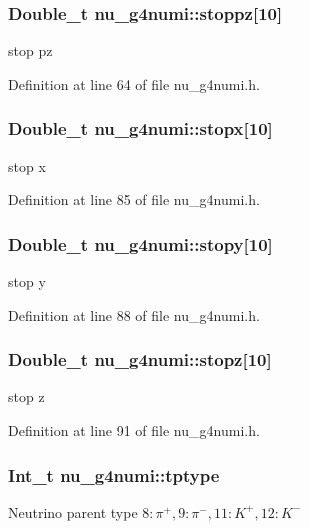 \hypertarget{classnu__g4numi_a64a1fb6d3798714d21c1135b76014d3a}{
\subsubsection[{stoppz}]{\setlength{\rightskip}{0pt plus 5cm}Double\-\_\-t nu\-\_\-g4numi\-::stoppz\mbox{[}10\mbox{]}}}\label{classnu__g4numi_a64a1fb6d3798714d21c1135b76014d3a}
stop pz 

Definition at line 64 of file nu\-\_\-g4numi.\-h.

\hypertarget{classnu__g4numi_a3a3be4d4530073e364c2681eedf1c549}{
\subsubsection[{stopx}]{\setlength{\rightskip}{0pt plus 5cm}Double\-\_\-t nu\-\_\-g4numi\-::stopx\mbox{[}10\mbox{]}}}\label{classnu__g4numi_a3a3be4d4530073e364c2681eedf1c549}
stop x 

Definition at line 85 of file nu\-\_\-g4numi.\-h.

\hypertarget{classnu__g4numi_a04c56aedc6b4d97052a8a827131bf5ba}{
\subsubsection[{stopy}]{\setlength{\rightskip}{0pt plus 5cm}Double\-\_\-t nu\-\_\-g4numi\-::stopy\mbox{[}10\mbox{]}}}\label{classnu__g4numi_a04c56aedc6b4d97052a8a827131bf5ba}
stop y 

Definition at line 88 of file nu\-\_\-g4numi.\-h.

\hypertarget{classnu__g4numi_ab4cc476c30fea6d69043531da7e6c969}{
\subsubsection[{stopz}]{\setlength{\rightskip}{0pt plus 5cm}Double\-\_\-t nu\-\_\-g4numi\-::stopz\mbox{[}10\mbox{]}}}\label{classnu__g4numi_ab4cc476c30fea6d69043531da7e6c969}
stop z 

Definition at line 91 of file nu\-\_\-g4numi.\-h.

\hypertarget{classnu__g4numi_a1047ac371479cee32c28f56adf885515}{
\subsubsection[{tptype}]{\setlength{\rightskip}{0pt plus 5cm}Int\-\_\-t nu\-\_\-g4numi\-::tptype}}\label{classnu__g4numi_a1047ac371479cee32c28f56adf885515}
Neutrino parent type $ 8: \pi^{+}, 9: \pi^{-}, 11: K^{+}, 12: K^{-}$ 

